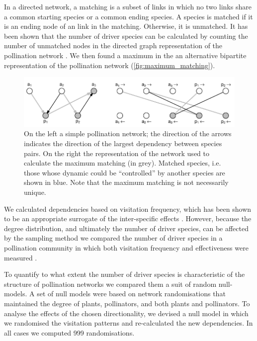 \documentclass[a4paper,10pt]{article}
\begin{document}
In a directed network, a matching is a subset of links in which no two links share a common starting species or a common ending species. A species is matched if it is an ending node of an link in the matching. Otherwise, it is unmatched. It has been shown that the number of driver species can be calculated by counting the number of unmatched nodes in the directed graph representation of the pollination network \autocite{Liu2011}. We then found a maximum in the an alternative bipartite representation of the pollination network \autocite{Csardi2006} (\autoref{fig:maximum_matching}). 

\begin{figure}
    \centering
    \includegraphics[width=\textwidth]{control_net}
    \caption{
    On the left a simple pollination network; the direction of the arrows indicates the direction of the largest dependency between species pairs. On the right the representation of the network used to calculate the maximum matching (in grey). Matched species, i.e. those whose dynamic could be ``controlled'' by another species are shown in blue. Note that the maximum matching is not necessarily unique.
    }
    \label{fig:maximum_matching}
\end{figure} 

We calculated dependencies based on visitation frequency, which has been shown to be an appropriate surrogate of the inter-specific effects \autocite{Bascompte2006, Vazquez2005}. However, because the degree distribution, and ultimately the number of driver species, can be affected by the sampling method \autocite{Bluthgen2010} we compared the number of driver species in a pollination community in which both visitation frequency and effectiveness were measured \autocite{Ballantyne2015}.

To quantify to what extent the number of driver species is characteristic of the structure of pollination networks we compared them a suit of random null-models. A set of null models were based on network randomisations that maintained the degree of plants, pollinators, and both plants and pollinators. To analyse the effects of the chosen directionality, we devised a null model in which we randomised the visitation patterns and re-calculated the new dependencies. In all cases we computed 999 randomisations.
\end{document}
